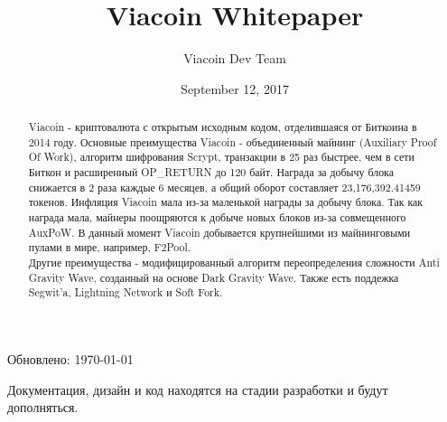 \documentclass{article}
\author{Viacoin Dev Team}
\title{Viacoin Whitepaper}
\date{September 12, 2017}
\begin{document}
\maketitle
{\normalfont
      Обновлено: \today}

\begin{abstract}\noindent
\normalsize Viacoin - криптовалюта с открытым исходным кодом, отделившаяся от
Биткоина \cite{bitcoin2008} в 2014 году. Основные преимущества Viacoin - объединенный
майнинг (Auxiliary Proof Of Work), алгоритм шифрования Scrypt, транзакции в 25 раз быстрее,
чем в сети Биткон и расширенный OP\_RETURN до 120 байт. Награда за добычу блока снижается
в 2 раза каждые 6 месяцев, а общий оборот составляет 23,176,392.41459 токенов.
Инфляция Viacoin мала из-за маленькой награды за добычу блока. Так как награда мала,
майнеры поощряются к добыче новых блоков из-за совмещенного AuxPoW. В данный
момент Viacoin добывается крупнейшими из  майнинговыми пулами в мире, например, F2Pool.
~\\
Другие преимущества - модифицированный алгоритм переопределения сложности Anti Gravity Wave, созданный на основе Dark Gravity Wave. Также есть поддежка Segwit'a, Lightning Network и Soft Fork.
\end{abstract}


\vfill \noindent
\small Документация, дизайн и код находятся на стадии разработки и будут дополняться.

\newpage

\normalsize
\end{document}
